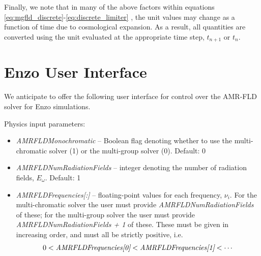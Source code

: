 \documentclass[10pt]{article}
\renewcommand{\(}{\left(}
\renewcommand{\)}{\right)}
\begin{document}
Finally, we note that in many of the above factors within equations
\eqref{eq:mgfld_discrete}-\eqref{eq:discrete_limiter} , the unit
values may change as a function of time due to cosmological expansion.
As a result, all quantities are converted using the unit evaluated at
the appropriate time step, $t_{n+1}$ or $t_n$.




\section{Enzo User Interface}
\label{sec:user_interface}

We anticipate to offer the following user interface for control over
the AMR-FLD solver for Enzo simulations.

Physics input parameters:
\begin{itemize}
\item {\em AMRFLDMonochromatic} -- Boolean flag denoting whether to
  use the multi-chromatic solver (1) or the multi-group solver (0).
  Default: 0
\item {\em AMRFLDNumRadiationFields} -- integer denoting the number of
  radiation fields, $E_{\omega}$.  Default: 1
\item {\em AMRFLDFrequencies[:]} -- floating-point values for each
  frequency, $\nu_i$.  For the multi-chromatic solver the user must
  provide {\em AMRFLDNumRadiationFields} of these; for the multi-group
  solver the user must provide {\em AMRFLDNumRadiationFields + 1} of
  these.  These must be given in increasing order, and must all be
  strictly positive, i.e.
  \[
     0 < \text{\em AMRFLDFrequencies[0]} < \text{\em
       AMRFLDFrequencies[1]} < \cdots
  \]
\end{itemize}
\end{document}
